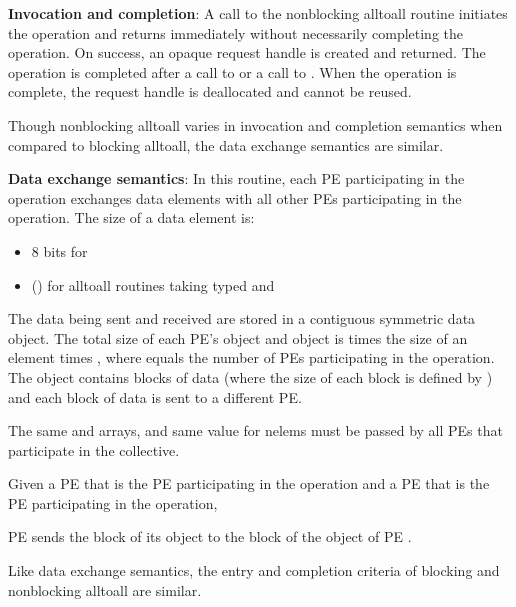\begin{apidefinition}
{    {\bf Invocation and completion}: A call to the nonblocking alltoall routine initiates the operation and returns
    immediately without necessarily completing the operation. On success,
    an opaque request handle is created and returned. The
    operation is completed after a call to  or
    a call to . When the operation is complete, the request handle
    is deallocated and cannot be reused.

    Though nonblocking alltoall varies in invocation and completion semantics
    when compared to blocking alltoall, the data exchange semantics are similar.

    {\bf Data exchange semantics}:
    In this routine, each \ac{PE}
    participating in the operation exchanges  data elements
    with all other \acp{PE} participating in the operation.
    The size of a data element is:
    \begin{itemize}
    \item 8 bits for 
    \item {}(\TYPE{}) for alltoall routines taking typed  and 
    \end{itemize}

    The data being sent and received are
    stored in a contiguous symmetric data object. The total size of each \ac{PE}'s
     object and  object is  times the size of
    an element
    times , where  equals the number of \acp{PE} participating
    in the operation.
    The  object contains  blocks of data
    (where the size of each block is defined by ) and each block of data
    is sent to a different \ac{PE}.

    The same \dest{} and \source{}
    arrays, and same value for nelems
    must be passed by all \acp{PE} that participate in the collective.

    Given a \ac{PE}  that is the \kth \ac{PE}
    participating in the operation and a \ac{PE}
     that is the \lth \ac{PE}
    participating in the operation,

    \ac{PE}  sends the \lth block of its  object to
    the \kth block of
    the  object of \ac{PE} .

    
    Like data exchange semantics, the entry and completion
    criteria of blocking and nonblocking alltoall are similar.

}
\end{apidefinition}
